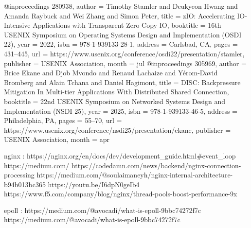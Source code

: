 @inproceedings {280938,
author = {Timothy Stamler and Deukyeon Hwang and Amanda Raybuck and Wei Zhang and Simon Peter},
title = {{zIO}: Accelerating {IO-Intensive} Applications with Transparent {Zero-Copy} {IO}},
booktitle = {16th USENIX Symposium on Operating Systems Design and Implementation (OSDI 22)},
year = {2022},
isbn = {978-1-939133-28-1},
address = {Carlsbad, CA},
pages = {431--445},
url = {https://www.usenix.org/conference/osdi22/presentation/stamler},
publisher = {USENIX Association},
month = jul
}
@inproceedings {305969,
author = {Brice Ekane and Djob Mvondo and Renaud Lachaize and Y{\'e}rom-David Bromberg and Alain Tchana and Daniel Hagimont},
title = {{DISC}: Backpressure Mitigation In Multi-tier Applications With Distributed Shared Connection},
booktitle = {22nd USENIX Symposium on Networked Systems Design and Implementation (NSDI 25)},
year = {2025},
isbn = {978-1-939133-46-5},
address = {Philadelphia, PA},
pages = {55--70},
url = {https://www.usenix.org/conference/nsdi25/presentation/ekane},
publisher = {USENIX Association},
month = apr
}


nginx :
https://nginx.org/en/docs/dev/development_guide.html#event_loop
https://medium.com/%
https://codedamn.com/news/backend/nginx-connection-processing
https://medium.com/@soulaimaneyh/nginx-internal-architecture-b94b013bc365
https://youtu.be/I6dpN0geIb4
https://www.f5.com/company/blog/nginx/thread-pools-boost-performance-9x

epoll :
https://medium.com/@avocadi/what-is-epoll-9bbc74272f7c
https://medium.com/@avocadi/what-is-epoll-9bbc74272f7c
